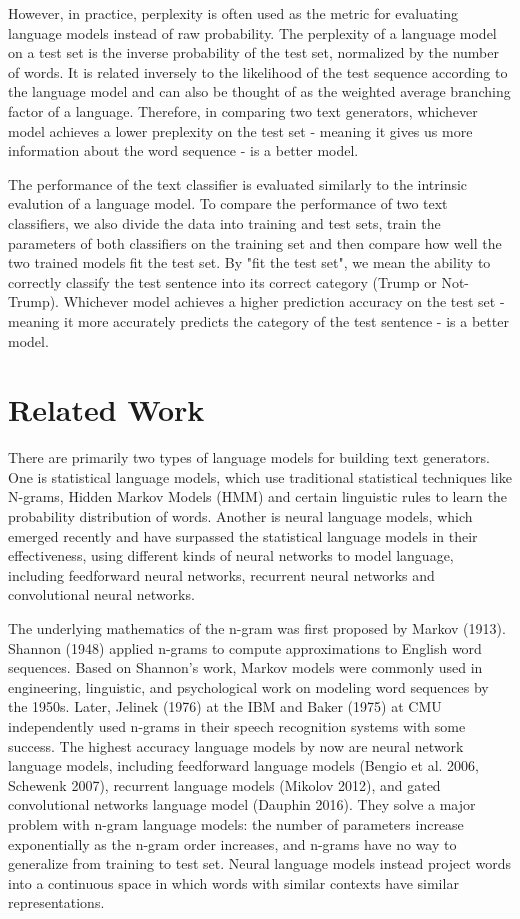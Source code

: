 \documentclass{article}
\begin{document}
However, in practice, perplexity is often used as the metric for evaluating language models instead of raw probability. The perplexity of a language model on a test set is the inverse probability of the test set, normalized by the number of words. It is related inversely to the likelihood of the test sequence according to the language model and can also be thought of as the weighted average branching factor of a language. Therefore, in comparing two text generators, whichever model achieves a lower preplexity on the test set - meaning it gives us more information about the word sequence - is a better model.

The performance of the text classifier is evaluated similarly to the intrinsic evalution of a language model. To compare the performance of two text classifiers, we also divide the data into training and test sets, train the parameters of both classifiers on the training set and then compare how well the two trained models fit the test set. By "fit the test set", we mean the ability to correctly classify the test sentence into its correct category (Trump or Not-Trump). Whichever model achieves a higher prediction accuracy on the test set - meaning it more accurately predicts the category of the test sentence - is a better model.
\section{Related Work}
There are primarily two types of language models for building text generators. One is statistical language models, which use traditional statistical techniques like N-grams, Hidden Markov Models (HMM) and certain linguistic rules to learn the probability distribution of words. Another is neural language models, which emerged recently and have surpassed the statistical language models in their effectiveness, using different kinds of neural networks to model language, including feedforward neural networks, recurrent neural networks and convolutional neural networks.

The underlying mathematics of the n-gram was first proposed by Markov (1913). Shannon (1948) applied n-grams to compute approximations to English word sequences. Based on Shannon's work, Markov models were commonly used in engineering, linguistic, and psychological work on modeling word sequences by the 1950s. Later, Jelinek (1976) at the IBM and Baker (1975) at CMU independently used n-grams in their speech recognition systems with some success. The highest accuracy language models by now are neural network language models, including feedforward language models (Bengio et al. 2006, Schewenk 2007), recurrent language models (Mikolov 2012), and gated convolutional networks language model (Dauphin 2016). They solve a major problem with n-gram language models: the number of parameters increase exponentially as the n-gram order increases, and n-grams have no way to generalize from training to test set. Neural language models instead project words into a continuous space in which words with similar contexts have similar representations.
\end{document}
